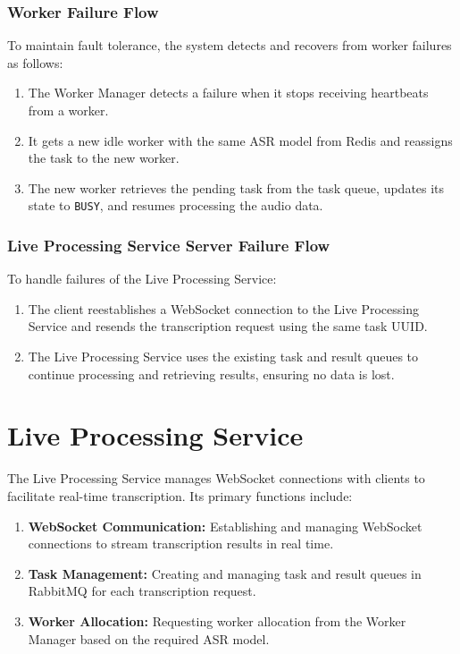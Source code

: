 \subsubsection{Worker Failure Flow}
To maintain fault tolerance, the system detects and recovers from worker failures as follows:
\begin{enumerate}
    \item The Worker Manager detects a failure when it stops receiving heartbeats from a worker.
    \item It gets a new idle worker with the same ASR model from Redis and reassigns the task to the new worker.
    \item The new worker retrieves the pending task from the task queue, updates its state to \texttt{BUSY}, and resumes processing the audio data.
\end{enumerate}

\subsubsection{Live Processing Service Server Failure Flow}
To handle failures of the Live Processing Service:
\begin{enumerate}
    \item The client reestablishes a WebSocket connection to the Live Processing Service and resends the transcription request using the same task UUID.
    \item The Live Processing Service uses the existing task and result queues to continue processing and retrieving results, ensuring no data is lost.
\end{enumerate}

\section{Live Processing Service}
The Live Processing Service manages WebSocket connections with clients to facilitate real-time transcription. Its primary functions include:
\begin{enumerate}
  \item \textbf{WebSocket Communication:} Establishing and managing WebSocket connections to stream transcription results in real time.
  \item \textbf{Task Management:} Creating and managing task and result queues in RabbitMQ for each transcription request.
  \item \textbf{Worker Allocation:} Requesting worker allocation from the Worker Manager based on the required ASR model.
\end{enumerate}



